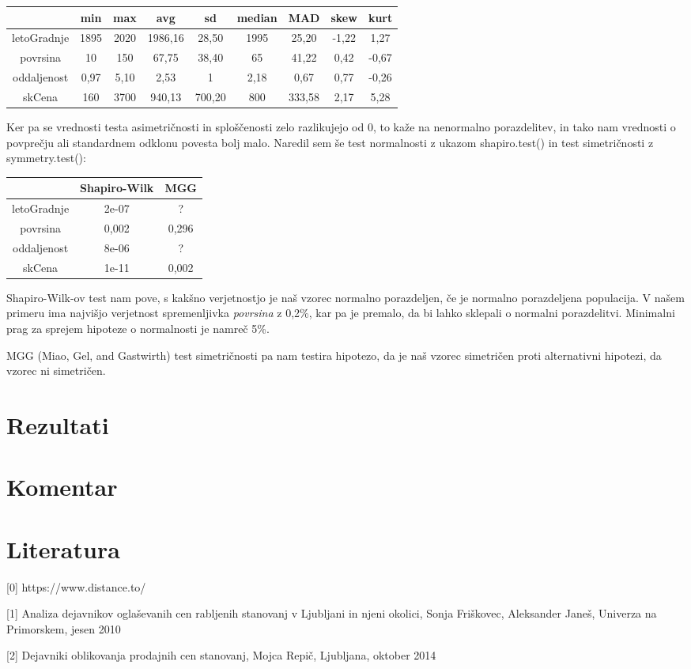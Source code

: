 \documentclass[a4paper, 12pt]{article}
\begin{document}
\begin{center}
\begin{tabular}{ c|cccccccc }
	& min & max & avg & sd & median & MAD & skew & kurt \\
	\hline
	letoGradnje & 1895 & 2020 & 1986,16 & 28,50 & 1995 & 25,20 & -1,22 & 1,27 \\
	povrsina & 10 & 150 & 67,75 & 38,40 & 65 & 41,22 & 0,42 & -0,67 \\
	oddaljenost & 0,97 & 5,10 & 2,53 & 1 & 2,18 & 0,67 & 0,77 & -0,26 \\
	skCena & 160 & 3700 & 940,13 & 700,20 & 800 & 333,58 & 2,17 & 5,28 \\
\end{tabular}
\end{center}
Ker pa se vrednosti testa asimetričnosti in sploščenosti zelo razlikujejo
od $ 0 $, to kaže na nenormalno porazdelitev, in tako nam vrednosti o povprečju
ali standardnem odklonu povesta bolj malo. Naredil sem še test normalnosti z
ukazom {\sf shapiro.test()} in test simetričnosti z {\sf symmetry.test()}:

\begin{center}
\begin{tabular}{ c|c|c }
	& Shapiro-Wilk & MGG \\
	\hline
	letoGradnje & 2e-07 & ? \\
	povrsina & 0,002 & 0,296 \\
	oddaljenost & 8e-06 & ? \\
	skCena & 1e-11 & 0,002 \\
\end{tabular}
\end{center}
Shapiro-Wilk-ov test nam pove, s kakšno verjetnostjo je naš vzorec normalno
porazdeljen, če je normalno porazdeljena populacija. V našem primeru ima
najvišjo verjetnost spremenljivka \textit{povrsina} z 0,2\%, kar pa je premalo,
da bi lahko sklepali o normalni porazdelitvi. Minimalni prag za sprejem
hipoteze o normalnosti je namreč 5\%.

MGG (Miao, Gel, and Gastwirth) test simetričnosti pa nam testira hipotezo, da
je naš vzorec simetričen proti alternativni hipotezi, da vzorec ni simetričen.


\section{Rezultati}

\section{Komentar}

\section{Literatura}

[0]
https://www.distance.to/

[1] Analiza dejavnikov oglaševanih cen rabljenih stanovanj v Ljubljani in njeni
okolici, Sonja Friškovec, Aleksander Janeš, Univerza na Primorskem, jesen 2010

[2] Dejavniki oblikovanja prodajnih cen stanovanj, Mojca Repič, Ljubljana,
oktober 2014
\end{document}
